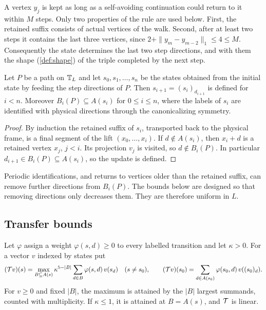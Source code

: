 A vertex $y_j$ is kept as long as a self-avoiding continuation could return to it within $M$ steps. Only two properties of the rule are used below. First, the retained suffix consists of actual vertices of the walk. Second, after at least two steps it contains the last three vertices, since $2+\|y_m-y_{m-2}\|_1\le4\le M$. Consequently the state determines the last two step directions, and with them the shape (\cref{def:shape}) of the triple completed by the next step.

\begin{lemma}\label{lem:automaton}
Let $P$ be a path on $\mathbb T_L$ and let $s_0,s_1,\dots,s_n$ be the states obtained from the initial state by feeding the step directions of $P$. Then $s_{i+1}=(s_i)_{d_{i+1}}$ is defined for $i<n$. Moreover $B_i(P)\subseteq A(s_i)$ for $0\le i\le n$, where the labels of $s_i$ are identified with physical directions through the canonicalizing symmetry.
\end{lemma}

\begin{proof}
By induction the retained suffix of $s_i$, transported back to the physical frame, is a final segment of the lift $(x_0,\dots,x_i)$. If $d\notin A(s_i)$, then $x_i+d$ is a retained vertex $x_j$, $j<i$. Its projection $v_j$ is visited, so $d\notin B_i(P)$. In particular $d_{i+1}\in B_i(P)\subseteq A(s_i)$, so the update is defined.
\end{proof}

Periodic identifications, and returns to vertices older than the retained suffix, can remove further directions from $B_i(P)$. The bounds below are designed so that removing directions only decreases them. They are therefore uniform in $L$.

\subsection{Transfer bounds}

Let $\varphi$ assign a weight $\varphi(s,d)\ge0$ to every labelled transition and let $\kappa>0$. For a vector $v$ indexed by states put
\begin{equation}\label{eq:transfer}
 (\mathcal T v)(s)=\max_{B\subseteq A(s)}\kappa^{5-|B|}\sum_{d\in B}\varphi(s,d)\,v(s_d)\quad(s\ne s_0),\qquad
 (\mathcal T v)(s_0)=\sum_{d\in A(s_0)}\varphi(s_0,d)\,v((s_0)_d).
\end{equation}
For $v\ge0$ and fixed $|B|$, the maximum is attained by the $|B|$ largest summands, counted with multiplicity. If $\kappa\le1$, it is attained at $B=A(s)$, and $\mathcal T$ is linear.

